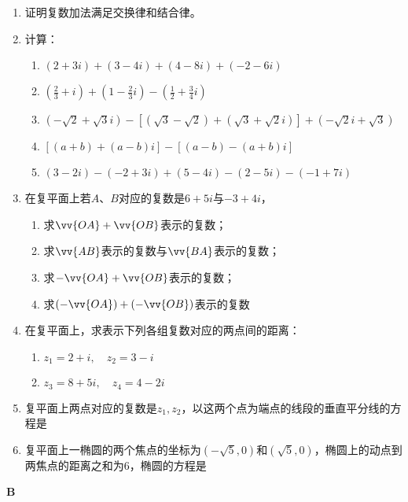 \begin{enumerate}
    \item 证明复数加法满足交换律和结合律。
    \item 计算：
\begin{enumerate}[(1)]
\item $(2+3i)+(3-4i)+(4-8i)+(-2-6i)$
\item $\left(\frac{2}{3}+i\right)+\left(1-\frac{2}{3}i\right)-\left(\frac{1}{2}+\frac{3}{4}i\right)$
\item  $\left(-\sqrt{2}+\sqrt{3}i\right)-\left[\left(\sqrt{3}-\sqrt{2}\right)+\left(\sqrt{3}+\sqrt{2}i\right)\right]+\left(-\sqrt{2}i+\sqrt{3}\right)$
\item $[(a+b)+(a-b)i]-[(a-b)-(a+b)i]$
\item $(3-2i)-(-2+3i)+(5-4i)-(2-5i)-(-1+7i)$
\end{enumerate}

\item 在复平面上若$A$、$B$对应的复数是$6+5i$与$-3+4i$，
\begin{enumerate}[(1)]
 \item 求$\vv{OA}+\vv{OB}$表示的复数；
\item 求$\vv{AB}$表示的复数与$\vv{BA}$表示的复数；
\item 求$-\vv{OA}+\vv{OB}$表示的复数；
\item 求$(-\vv{OA})+(-\vv{OB})$表示的复数  
\end{enumerate}
\item 在复平面上，求表示下列各组复数对应的两点间的距离：
\begin{multicols}{2}
\begin{enumerate}[(1)]
\item $z_1=2+i,\quad z_2=3-i$
\item $z_3=8+5i,\quad z_4=4-2i$
\end{enumerate}
\end{multicols}

\item 复平面上两点对应的复数是$z_1,z_2$，以这两个点为端点的线段的垂直平分线的方程是\blank\blank
\item 复平面上一椭圆的两个焦点的坐标为$(-\sqrt{5},0)$和$(\sqrt{5},0)$，椭圆上的动点到两焦点的距离之和为6，椭圆的方程是\blank\blank
\end{enumerate}

\begin{center}
    \bfseries B
\end{center}

